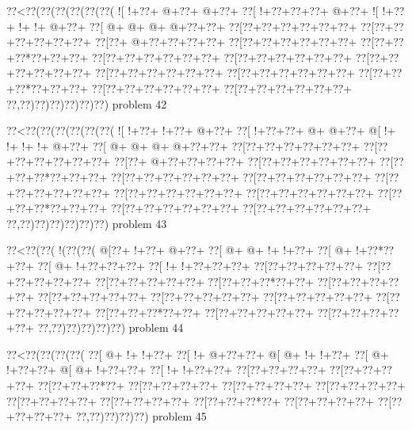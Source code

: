 \vbox{\vbox{\goo
\0??<\0??(\0??(\0??(\0??(\0??(\0??(
\- ![\- !+\0??+\- @+\0??+\- @+\0??+
\0??[\- !+\0??+\0??+\0??+\- @+\0??+
\- ![\- !+\0??+\- !+\- !+\- @+\0??+
\0??[\- @+\- @+\- @+\- @+\0??+\0??+
\0??[\0??+\0??+\0??+\0??+\0??+\0??+
\0??[\0??+\0??+\0??+\0??+\0??+\0??+
\0??[\0??+\- @+\0??+\0??+\0??+\0??+
\0??[\0??+\0??+\0??+\0??+\0??+\0??+
\0??[\0??+\0??+\0??*\0??+\0??+\0??+
\0??[\0??+\0??+\0??+\0??+\0??+\0??+
\0??[\0??+\0??+\0??+\0??+\0??+\0??+
\0??[\0??+\0??+\0??+\0??+\0??+\0??+
\0??[\0??+\0??+\0??+\0??+\0??+\0??+
\0??[\0??+\0??+\0??+\0??+\0??+\0??+
\0??[\0??+\0??+\0??*\0??+\0??+\0??+
\0??[\0??+\0??+\0??+\0??+\0??+\0??+
\0??[\0??+\0??+\0??+\0??+\0??+\0??+
\0??,\0??)\0??)\0??)\0??)\0??)\0??)
}
\hfil problem 42\hfil\break
}

\vbox{\vbox{\goo
\0??<\0??(\0??(\0??(\0??(\0??(\0??(
\- ![\- !+\0??+\- !+\0??+\- @+\0??+
\0??[\- !+\0??+\0??+\- @+\- @+\0??+
\- @[\- !+\- !+\- !+\- !+\- @+\0??+
\0??[\- @+\- @+\- @+\- @+\0??+\0??+
\0??[\0??+\0??+\0??+\0??+\0??+\0??+
\0??[\0??+\0??+\0??+\0??+\0??+\0??+
\0??[\0??+\- @+\0??+\0??+\0??+\0??+
\0??[\0??+\0??+\0??+\0??+\0??+\0??+
\0??[\0??+\0??+\0??*\0??+\0??+\0??+
\0??[\0??+\0??+\0??+\0??+\0??+\0??+
\0??[\0??+\0??+\0??+\0??+\0??+\0??+
\0??[\0??+\0??+\0??+\0??+\0??+\0??+
\0??[\0??+\0??+\0??+\0??+\0??+\0??+
\0??[\0??+\0??+\0??+\0??+\0??+\0??+
\0??[\0??+\0??+\0??*\0??+\0??+\0??+
\0??[\0??+\0??+\0??+\0??+\0??+\0??+
\0??[\0??+\0??+\0??+\0??+\0??+\0??+
\0??,\0??)\0??)\0??)\0??)\0??)\0??)
}
\hfil problem 43\hfil\break
}

\vbox{\vbox{\goo
\0??<\0??(\0??(\- !(\0??(\0??(
\- @[\0??+\- !+\0??+\- @+\0??+
\0??[\- @+\- @+\- !+\- !+\0??+
\0??[\- @+\- !+\0??*\0??+\0??+
\0??[\- @+\- !+\0??+\0??+\0??+
\0??[\- !+\- !+\0??+\0??+\0??+
\0??[\0??+\0??+\0??+\0??+\0??+
\0??[\0??+\0??+\0??+\0??+\0??+
\0??[\0??+\0??+\0??+\0??+\0??+
\0??[\0??+\0??+\0??*\0??+\0??+
\0??[\0??+\0??+\0??+\0??+\0??+
\0??[\0??+\0??+\0??+\0??+\0??+
\0??[\0??+\0??+\0??+\0??+\0??+
\0??[\0??+\0??+\0??+\0??+\0??+
\0??[\0??+\0??+\0??+\0??+\0??+
\0??[\0??+\0??+\0??*\0??+\0??+
\0??[\0??+\0??+\0??+\0??+\0??+
\0??[\0??+\0??+\0??+\0??+\0??+
\0??,\0??)\0??)\0??)\0??)\0??)
}
\hfil problem 44\hfil\break
}

\vbox{\vbox{\goo
\0??<\0??(\0??(\0??(\0??(
\0??[\- @+\- !+\- !+\0??+
\0??[\- !+\- @+\0??+\0??+
\- @[\- @+\- !+\- !+\0??+
\0??[\- @+\- !+\0??+\0??+
\- @[\- @+\- !+\0??+\0??+
\0??[\- !+\- !+\0??+\0??+
\0??[\0??+\0??+\0??+\0??+
\0??[\0??+\0??+\0??+\0??+
\0??[\0??+\0??+\0??*\0??+
\0??[\0??+\0??+\0??+\0??+
\0??[\0??+\0??+\0??+\0??+
\0??[\0??+\0??+\0??+\0??+
\0??[\0??+\0??+\0??+\0??+
\0??[\0??+\0??+\0??+\0??+
\0??[\0??+\0??+\0??*\0??+
\0??[\0??+\0??+\0??+\0??+
\0??[\0??+\0??+\0??+\0??+
\0??,\0??)\0??)\0??)\0??)
}
\hfil problem 45\hfil\break
}


